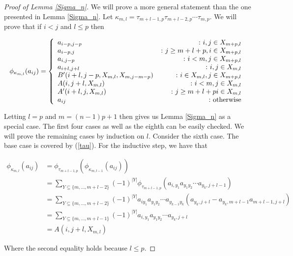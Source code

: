 \documentclass[11pt]{amsart}
\def\t{{\tau}}
\def\k{{\kappa}}
\theoremstyle{definition}
\begin{document}
\begin{proof} [Proof of Lemma \ref{Sigma_n}]

We will prove a more general statement than the one presented in Lemma \ref{Sigma_n}.  Let $\kappa_{m,l} = \t_{m+l-1,p}\t_{m+l-2,p}\cdots\t_{m,p}$.  We will prove that if $i<j$ and $l\le p$ then

$$
\phi_{\kappa_{m,l}}(a_{ij}) =
\left\{
     \begin{array}{lr}
       a_{i-p,j-p} & \colon i,j\in X_{m+p,l}\\
       a_{i-p,j} &\colon j\ge m+l+p, i\in X_{m+p,l}\\
       a_{i,j-p} & \colon i<m, j\in X_{m+p,l}\\
       a_{i+l,j+l} &\colon i,j\in X_{m,l}\\
       B'(i+l,j-p,X_{m,l},X_{m,j-m-p}) & \colon i\in X_{m,l}, j\in X_{m+p,l}\\
       A(i,j+l,X_{m,l}) & \colon i<m, j\in X_{m,l}\\
       A'(i+l,j,X_{m,l}) & \colon j\ge m+l+p i\in X_{m,l}\\
       a_{ij} & \colon \textnormal{otherwise}
     \end{array}
\right.
$$


Letting $l=p$ and $m=(n-1)p+1$ then gives us Lemma \ref{Sigma_n} as a special case.  The first four cases  as well as the eighth can be easily checked.  We will prove the remaining cases by induction on $l$.  Consider the sixth case.  The base case is covered by (\ref{tau}).  For the inductive step, we have that

\begin{align*}
\phi_{\k_{m,l}}(a_{ij}) &= \phi_{\t_{m+l-1,p}}\left(\phi_{\k_{m,l-1}}(a_{ij})\right)\\
&= \sum_{Y\subseteq \{m,\ldots,m+l-2\}} (-1)^{|Y|} \phi_{\t_{m+l-1,p}}\left(a_{i,y_1}a_{y_1y_2}\cdots a_{y_k,j+l-1}\right)\\
&= \sum_{Y\subseteq \{m,\ldots,m+l-2\}} (-1)^{|Y|} a_{iy_1}a_{y_1y_2}\cdots a_{y_{k-1}y_k}\left(a_{y_k,j+l}-a_{y_k,m+l-1}a_{m+l-1,j+l}\right)\\
&= \sum_{Y\subseteq \{m,\ldots,m+l-1\}} (-1)^{|Y|} a_{i,y_1}a_{y_1y_2}\cdots a_{y_k,j+l}\\
&= A(i,j+l,X_{m,l})
\end{align*}

Where the second equality holds because $l\le p$.


\end{proof}
\end{document}
